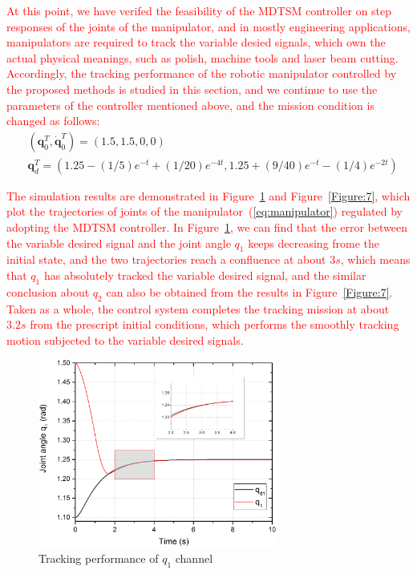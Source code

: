 \documentclass[3p]{elsarticle}
\theoremstyle{plain}
\theoremstyle{remark}
\begin{document}
\textcolor{red}{At this point, we have verifed the feasibility of the MDTSM controller on step responses of the joints of the manipulator, and in mostly engineering applications, manipulators are required to track the variable desied signals, which own the actual physical meanings, such as polish, machine tools and laser beam cutting. Accordingly, the tracking performance of the robotic manipulator controlled by the proposed methods is studied in this section, and we continue to use the parameters of the controller mentioned above, and the mission condition is changed as follows:}
\begin{align*}
&(\bm q_0^T, \dot{\bm q}_0^T)= (1.5,1.5,0,0)\\
&{\bm q}_d^T=(1.25-(1/5)e^{-t}+(1/20)e^{-4t},1.25+(9/40)e^{-t}-(1/4)e^{-2t})
\end{align*}\par
 \textcolor{red}{The simulation results are demonstrated in Figure~\ref{Figure:6} and Figure~\ref{Figure:7}, which plot the trajectories of joints of the manipulator~(\ref{eq:manipulator}) regulated by adopting the MDTSM controller. In Figure~\ref{Figure:6}, we can find that the error between the variable desired signal and the joint angle $q_1$ keeps decreasing frome the initial state, and the two trajectories reach a confluence at about $3s$, which means that $q_1$ has absolutely tracked the variable desired signal, and the similar conclusion about $q_2$ can also be obtained from the results in Figure~\ref{Figure:7}. Taken as a whole, the control system completes the tracking mission at about $3.2s$ from the prescript initial conditions, which performs the smoothly tracking motion subjected to the variable desired signals.}
\begin{figure}
\centering
\includegraphics[width=0.7\textwidth]{paper3_fig6.eps}
\caption{Tracking performance of $q_1$ channel}
\label{Figure:6}
\end{figure}
\end{document}
